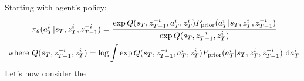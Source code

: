 Starting with agent's policy:
\begin{equation}
\begin{aligned}
    &\pi_\theta(a^i_T | s_T, z^i_T, z^{-i}_{T-1}) = \frac{\exp Q(s_T,  z^{-i}_{T-1}, a^i_T, z^i_T) P_{\text{prior}}(a^i_T | s_T, z^i_T, z^{-i}_{T-1})}{\exp Q(s_T,  z^{-i}_{T-1}, z^i_T)} \\
    \text{ where }&Q(s_T,  z^{-i}_{T-1}, z^i_T) = \log \int \exp Q(s_T,  z^{-i}_{T-1}, a^i_T, z^i_T) P_{\text{prior}}(a^i_T | s_T, z^i_T, z^{-i}_{T-1}) \ \mathrm{d} a^i_T
\end{aligned}
\end{equation}
Let's now consider the 